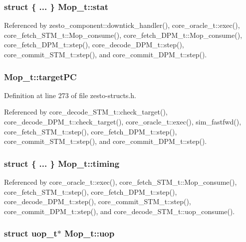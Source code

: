 \subsubsection[{stat}]{\setlength{\rightskip}{0pt plus 5cm}struct \{ ... \}   {\bf Mop\_\-t::stat}}\label{structMop__t_42838437539e18e14b2049aa3ad512c2}




Referenced by zesto\_\-component::downtick\_\-handler(), core\_\-oracle\_\-t::exec(), core\_\-fetch\_\-STM\_\-t::Mop\_\-consume(), core\_\-fetch\_\-DPM\_\-t::Mop\_\-consume(), core\_\-fetch\_\-DPM\_\-t::step(), core\_\-decode\_\-DPM\_\-t::step(), core\_\-commit\_\-STM\_\-t::step(), and core\_\-commit\_\-DPM\_\-t::step().
\subsubsection[{targetPC}]{ {\bf Mop\_\-t::targetPC}}\label{structMop__t_f820451bdee352d521eb3bf905c3d4e0}




Definition at line 273 of file zesto-structs.h.

Referenced by core\_\-decode\_\-STM\_\-t::check\_\-target(), core\_\-decode\_\-DPM\_\-t::check\_\-target(), core\_\-oracle\_\-t::exec(), sim\_\-fastfwd(), core\_\-fetch\_\-STM\_\-t::step(), core\_\-fetch\_\-DPM\_\-t::step(), core\_\-commit\_\-STM\_\-t::step(), and core\_\-commit\_\-DPM\_\-t::step().
\subsubsection[{timing}]{\setlength{\rightskip}{0pt plus 5cm}struct \{ ... \}   {\bf Mop\_\-t::timing}}\label{structMop__t_7cbb20c576aa6fff6bfcbd39a074528f}




Referenced by core\_\-oracle\_\-t::exec(), core\_\-fetch\_\-STM\_\-t::Mop\_\-consume(), core\_\-fetch\_\-STM\_\-t::step(), core\_\-fetch\_\-DPM\_\-t::step(), core\_\-decode\_\-DPM\_\-t::step(), core\_\-commit\_\-STM\_\-t::step(), core\_\-commit\_\-DPM\_\-t::step(), and core\_\-decode\_\-STM\_\-t::uop\_\-consume().
\subsubsection[{uop}]{\setlength{\rightskip}{0pt plus 5cm}struct {\bf uop\_\-t}$\ast$ {\bf Mop\_\-t::uop}\hspace{0.3cm}{\tt  [read]}}\label{structMop__t_b435acfedb392843bc50658c7650cbdd}




